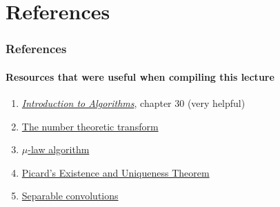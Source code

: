 \documentclass[11pt,handout]{beamer}             %
\begin{document}
\section{References}
\begin{frame}
\frametitle{References}
\framesubtitle{Resources that were useful when compiling this lecture}
\begin{enumerate}
  \item \href{https://mitpress.mit.edu/books/introduction-algorithms-third-edition}
    {\textit{Introduction to Algorithms}}, chapter 30 (very helpful)
  \item \href{https://www.nayuki.io/page/number-theoretic-transform-integer-dft}
    {The number theoretic transform}
  \item \href{https://en.wikipedia.org/wiki/\%CE\%9C-law_algorithm}
    {\( \mu \)-law algorithm}
  \item \href{https://ptolemy.berkeley.edu/projects/embedded/eecsx44/lectures/Spring2013/Picard.pdf}
    {Picard's Existence and Uniqueness Theorem}
  \item \href{https://towardsdatascience.com/a-basic-introduction-to-separable-convolutions-b99ec3102728}
    {Separable convolutions}
\end{enumerate}
\end{frame}
\end{document}
